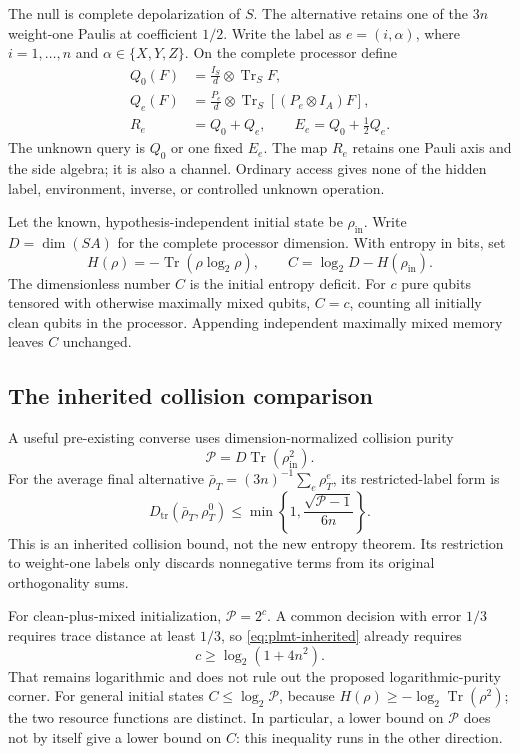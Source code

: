 \documentclass[11pt,a4paper]{article}
\numberwithin{equation}{section}
\theoremstyle{definition}
\theoremstyle{remark}
\begin{document}
The null is complete depolarization of \(S\). The alternative retains one of the \(3n\) weight-one Paulis at coefficient \(1/2\). Write the label as \(e=(i,\alpha)\), where \(i=1,\ldots,n\) and \(\alpha\in\{X,Y,Z\}\). On the complete processor define
\begin{align}
 Q_0(F)&=\frac{I_S}{d}\otimes\operatorname{Tr}_S F,\\
 Q_e(F)&=\frac{P_e}{d}\otimes
 \operatorname{Tr}_S[(P_e\otimes I_A)F],\\
 R_e&=Q_0+Q_e,\qquad E_e=Q_0+\frac12Q_e.
 \label{eq:plmt-entropy-maps}
\end{align}
The unknown query is \(Q_0\) or one fixed \(E_e\). The map \(R_e\) retains one Pauli axis and the side algebra; it is also a channel. Ordinary access gives none of the hidden label, environment, inverse, or controlled unknown operation.

Let the known, hypothesis-independent initial state be \(\rho_{\mathrm{in}}\). Write \(D=\dim(SA)\) for the complete processor dimension. With entropy in bits, set
\begin{equation}
 H(\rho)=-\operatorname{Tr}(\rho\log_2\rho),\qquad
 C=\log_2D-H(\rho_{\mathrm{in}}).
 \label{eq:plmt-C}
\end{equation}
The dimensionless number \(C\) is the initial entropy deficit. For \(c\) pure qubits tensored with otherwise maximally mixed qubits, \(C=c\), counting all initially clean qubits in the processor. Appending independent maximally mixed memory leaves \(C\) unchanged.



\subsection{The inherited collision comparison}
A useful pre-existing converse uses dimension-normalized collision purity
\[
 \mathcal P=D\operatorname{Tr}(\rho_{\mathrm{in}}^2).
\]
For the average final alternative
\(\bar\rho_T=(3n)^{-1}\sum_e\rho_T^e\), its restricted-label form is
\begin{equation}
 D_{\mathrm{tr}}(\bar\rho_T,\rho_T^0)
 \leq\min\left\{1,\frac{\sqrt{\mathcal P-1}}{6n}\right\}.
 \label{eq:plmt-inherited}
\end{equation}
This is an inherited collision bound, not the new entropy theorem. Its restriction to weight-one labels only discards nonnegative terms from its original orthogonality sums.

For clean-plus-mixed initialization, \(\mathcal P=2^c\). A common decision with error \(1/3\) requires trace distance at least \(1/3\), so \eqref{eq:plmt-inherited} already requires
\[
 c\geq\log_2(1+4n^2).
\]
That remains logarithmic and does not rule out the proposed logarithmic-purity corner. For general initial states \(C\leq\log_2\mathcal P\), because
\(H(\rho)\geq-\log_2\operatorname{Tr}(\rho^2)\); the two resource functions are distinct.
In particular, a lower bound on \(\mathcal P\) does not by itself give a lower bound on \(C\): this inequality runs in the other direction.
\end{document}
